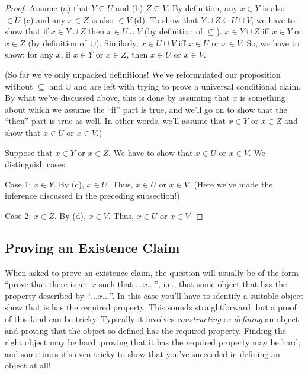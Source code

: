 \documentclass[../../../include/open-logic-section]{subfiles}
\begin{document}
\begin{proof}
  Assume (a) that $Y \subseteq U$ and (b) $Z \subseteq V$. By
  definition, any $x \in Y$ is also $\in U$ (c) and any $x \in Z$ is
  also $\in V$ (d).  To show that $Y \cup Z \subseteq U \cup V$, we
  have to show that if $x \in Y \cup Z$ then $x \in U \cup V$ (by
  definition of $\subseteq$). $x \in Y \cup Z$ iff $x \in Y$ or $x \in
  Z$ (by definition of~$\cup$). Similarly, $x \in U \cup V$ iff $x \in
  U$ or $x \in V$. So, we have to show: for any $x$, if $x \in Y$ or
  $x \in Z$, then $x \in U$ or $x \in V$.

  (So far we've only unpacked definitions!{} We've reformulated our
  proposition without $\subseteq$ and $\cup$ and are left with trying
  to prove a universal conditional claim. By what we've discussed
  above, this is done by assuming that $x$ is something about which we
  assume the ``if'' part is true, and we'll go on to show that the
  ``then'' part is true as well. In other words, we'll assume that $x
  \in Y$ or $x \in Z$ and show that $x \in U$ or $x \in V$.)

  Suppose that $x \in Y$ or $x \in Z$. We have to show that $x \in U$
  or $x \in V$. We distinguish cases.

  Case 1: $x \in Y$. By (c), $x \in U$. Thus, $x \in U$ or $x \in
  V$. (Here we've made the inference discussed in the preceding
  subsection!)
      
  Case 2: $x \in Z$. By (d), $x \in V$. Thus, $x \in U$ or $x \in V$.
 \end{proof}


\subsection{Proving an Existence Claim}

When asked to prove an existence claim, the question will usually be
of the form ``prove that there is an~$x$ such that $\dots x \dots$'',
i.e., that some object that has the property described by ``$\dots x
\dots$''. In this case you'll have to identify a suitable object show
that is has the required property.  This sounds straightforward, but a
proof of this kind can be tricky. Typically it involves
\emph{constructing} or \emph{defining} an object and proving that the
object so defined has the required property. Finding the right object
may be hard, proving that it has the required property may be hard,
and sometimes it's even tricky to show that you've succeeded in
defining an object at all!{}
\end{document}
